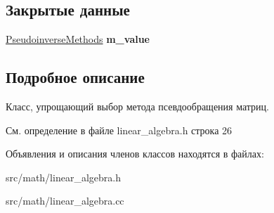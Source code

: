 \subsection*{Закрытые данные}
\begin{DoxyCompactItemize}
\item 
\hyperlink{namespace_math_1_1_lin_alg_a34ee452c5d64eeb10e1bb63cf887af17}{Pseudoinverse\+Methods} {\bfseries m\+\_\+value}\hypertarget{class_math_1_1_lin_alg_1_1_current_pinv_method_a38f44a507f0ade147651055746b2010e}{}\label{class_math_1_1_lin_alg_1_1_current_pinv_method_a38f44a507f0ade147651055746b2010e}

\end{DoxyCompactItemize}


\subsection{Подробное описание}
Класс, упрощающий выбор метода псевдообращения матриц. 

См. определение в файле linear\+\_\+algebra.\+h строка 26



Объявления и описания членов классов находятся в файлах\+:\begin{DoxyCompactItemize}
\item 
src/math/linear\+\_\+algebra.\+h\item 
src/math/linear\+\_\+algebra.\+cc\end{DoxyCompactItemize}
